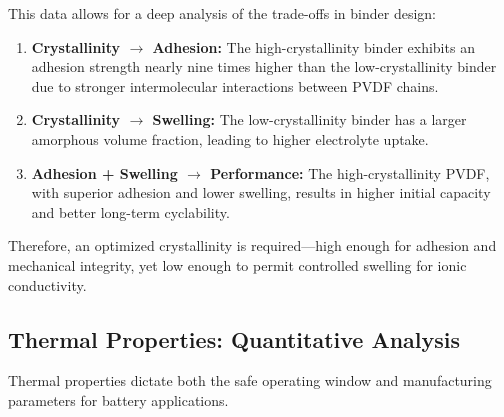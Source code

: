 \documentclass[12pt,a4paper]{article}
\begin{document}
This data allows for a deep analysis of the trade-offs in binder design:\citep{ref1}

\begin{enumerate}
  \item \textbf{Crystallinity $\rightarrow$ Adhesion:} The high-crystallinity binder exhibits an adhesion strength nearly nine times higher than the low-crystallinity binder due to stronger intermolecular interactions between PVDF chains.

  \item \textbf{Crystallinity $\rightarrow$ Swelling:} The low-crystallinity binder has a larger amorphous volume fraction, leading to higher electrolyte uptake.

  \item \textbf{Adhesion + Swelling $\rightarrow$ Performance:} The high-crystallinity PVDF, with superior adhesion and lower swelling, results in higher initial capacity and better long-term cyclability.
\end{enumerate}

Therefore, an optimized crystallinity is required—high enough for adhesion and mechanical integrity, yet low enough to permit controlled swelling for ionic conductivity.\citep{ref1}

\subsection{Thermal Properties: Quantitative Analysis}

Thermal properties dictate both the safe operating window and manufacturing parameters for battery applications.\citep{ref1}
\end{document}
